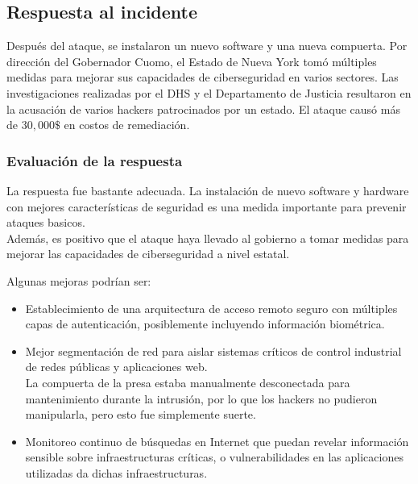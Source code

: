 \subsection{Respuesta al incidente}
Después del ataque, se instalaron un nuevo software y una nueva compuerta. Por dirección del Gobernador Cuomo, el Estado de Nueva York tomó múltiples medidas para mejorar sus capacidades de ciberseguridad en varios sectores. Las investigaciones realizadas por el DHS y el Departamento de Justicia resultaron en la acusación de varios hackers patrocinados por un estado. El ataque causó más de $30,000\$$ en costos de remediación.

\subsubsection{Evaluación de la respuesta}
La respuesta fue bastante adecuada.
La instalación de nuevo software y hardware con mejores características de seguridad es una medida importante para prevenir ataques basicos.\\
Además, es positivo que el ataque haya llevado al gobierno a tomar medidas para mejorar las capacidades de ciberseguridad a nivel estatal.



Algunas mejoras podrían ser:
\begin{itemize}
    \item Establecimiento de una arquitectura de acceso remoto seguro con múltiples capas de autenticación, posiblemente incluyendo información biométrica.
    \item Mejor segmentación de red para aislar sistemas críticos de control industrial de redes públicas y aplicaciones web.\\
    La compuerta de la presa estaba manualmente desconectada para mantenimiento durante la intrusión, por lo que los hackers no pudieron manipularla, pero esto fue simplemente suerte.
    \item Monitoreo continuo de búsquedas en Internet que puedan revelar información sensible sobre infraestructuras críticas, o vulnerabilidades en las aplicaciones utilizadas da dichas infraestructuras.
\end{itemize}

